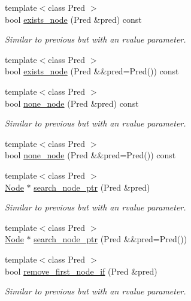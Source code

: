 \begin{DoxyCompactItemize}
{\footnotesize template$<$class Pred $>$ }\\bool \hyperlink{class_designar_1_1_base_graph_a3631470de61b819211c72fdd2ac31b34}{exists\+\_\+node} (Pred \&pred) const
\begin{DoxyCompactList}\small\item\em Similar to previous but with an rvalue parameter. \end{DoxyCompactList}\item 
{\footnotesize template$<$class Pred $>$ }\\bool \hyperlink{class_designar_1_1_base_graph_a62df2c7ec71d2b009e96f8974968a3fc}{exists\+\_\+node} (Pred \&\&pred=Pred()) const
\item 
{\footnotesize template$<$class Pred $>$ }\\bool \hyperlink{class_designar_1_1_base_graph_aa87c903e7fbf82a30edc9e442a115050}{none\+\_\+node} (Pred \&pred) const
\begin{DoxyCompactList}\small\item\em Similar to previous but with an rvalue parameter. \end{DoxyCompactList}\item 
{\footnotesize template$<$class Pred $>$ }\\bool \hyperlink{class_designar_1_1_base_graph_a394cdb81d0b0402e348dc87d2456d2d7}{none\+\_\+node} (Pred \&\&pred=Pred()) const
\item 
{\footnotesize template$<$class Pred $>$ }\\\hyperlink{namespace_designar_a5af326c65aa2bd26b26c410f2030d09e}{Node} $\ast$ \hyperlink{class_designar_1_1_base_graph_aa15b13f58a4961b1593045d1e228adec}{search\+\_\+node\+\_\+ptr} (Pred \&pred)
\begin{DoxyCompactList}\small\item\em Similar to previous but with an rvalue parameter. \end{DoxyCompactList}\item 
{\footnotesize template$<$class Pred $>$ }\\\hyperlink{namespace_designar_a5af326c65aa2bd26b26c410f2030d09e}{Node} $\ast$ \hyperlink{class_designar_1_1_base_graph_a1f19e5a79bfa156fd4cd80f3d8e27aa4}{search\+\_\+node\+\_\+ptr} (Pred \&\&pred=Pred())
\item 
{\footnotesize template$<$class Pred $>$ }\\bool \hyperlink{class_designar_1_1_base_graph_a1311af417ba4d373d7051b73cc2696ec}{remove\+\_\+first\+\_\+node\+\_\+if} (Pred \&pred)
\begin{DoxyCompactList}\small\item\em Similar to previous but with an rvalue parameter. \end{DoxyCompactList}\item 

\end{DoxyCompactItemize}
